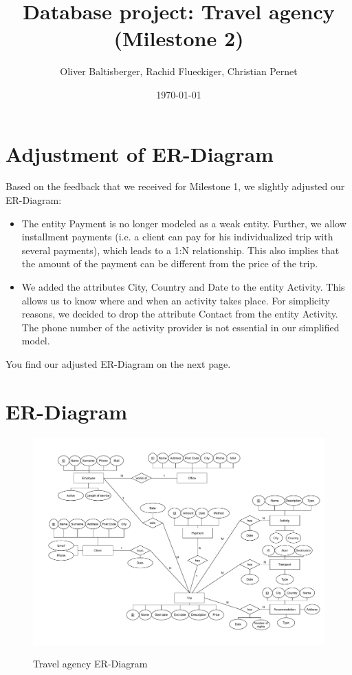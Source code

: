 \documentclass{article}
\title{Database project: Travel agency \\ (Milestone 2)}
\author{Oliver Baltisberger, Rachid Flueckiger, Christian Pernet}
\date{\today}
\begin{document}
	\maketitle
	
	\section*{Adjustment of ER-Diagram}
	Based on the feedback that we received for Milestone 1, we slightly adjusted our ER-Diagram:
	\begin{itemize}
		\item The entity Payment is no longer modeled as a weak entity. Further, we allow installment payments (i.e. a client can pay for his individualized trip with several payments), which leads to a 1:N relationship.
		This also implies that the amount of the payment can be different from the price of the trip.
		\item We added the attributes City, Country and Date to the entity Activity. This allows us to know where and when an activity takes place.
		For simplicity reasons, we decided to drop the attribute Contact from the entity Activity. The phone number of the activity provider is not essential in our simplified model.
	\end{itemize}
	
You find our adjusted ER-Diagram on the next page.
	\newpage
	
	\section*{ER-Diagram}
	\begin{figure}[htbp]
		\centering
			\includegraphics[width=1.15\textwidth, angle=90]{../Diagramm.pdf}
		\label{ER-Model}
		\caption{Travel agency ER-Diagram}
	\end{figure}
	
\end{document}
